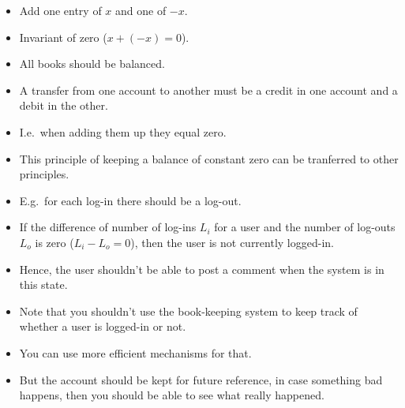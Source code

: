 \begin{frame}
  \begin{definition}
    \begin{itemize}
      \item Add one entry of \(x\) and one of \(-x\).
      \item Invariant of zero (\(x+(-x) = 0\)).
    \end{itemize}
  \end{definition}

  \begin{example}
    \begin{itemize}
      \item All books should be balanced.

      \item A transfer from one account to another must be a credit in one 
        account and a debit in the other.

      \item I.e.\ when adding them up they equal zero.
    \end{itemize}
  \end{example}
\end{frame}

\begin{frame}
  \begin{itemize}
    \item This principle of keeping a balance of constant zero can be 
      tranferred to other principles.

    \item E.g.\ for each log-in there should be a log-out.

    \item If the difference of number of log-ins \(L_i\) for a user and the 
      number of log-outs \(L_o\) is zero (\(L_i-L_o = 0\)), then the user is 
      not currently logged-in.

    \item Hence, the user shouldn't be able to post a comment when the system 
      is in this state.
  \end{itemize}
\end{frame}

\begin{frame}
  \begin{remark}
    \begin{itemize}
      \item Note that you shouldn't use the book-keeping system to keep track of 
        whether a user is logged-in or not.

      \item You can use more efficient mechanisms for that.

      \item But the account should be kept for future reference, in case 
        something bad happens, then you should be able to see what really 
        happened.
    \end{itemize}
  \end{remark}
\end{frame}

